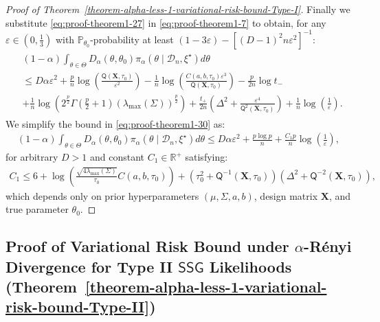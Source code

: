 \documentclass[12pt]{article}
\numberwithin{equation}{section}
\begin{document}
\begin{proof}[Proof of Theorem~\ref{theorem-alpha-less-1-variational-risk-bound-Type-I}]
Finally we substitute \eqref{eq:proof-theorem1-27} in \eqref{eq:proof-theorem1-7} to obtain, for any $\varepsilon\in \left(0, \frac{1}{3}\right)$ with $\mathbb{P}_{\theta_0}$-probability at least $(1-3\varepsilon) - [(D-1)^2n\varepsilon^2]^{-1}$:
%
\begin{align}\label{eq:proof-theorem1-30}
    \begin{split}
        &(1-\alpha)\int_{\theta\in \Theta}D_{\alpha}(\theta, \theta_0)\pi_{\alpha}(\theta\mid \mathcal{D}_n, \xi^{\star})d\theta\\
        &\leq D\alpha \varepsilon^2 + \frac{p}{n}\log\left(\frac{\mathsf{Q}(\mathbf{X}, \tau_0)}{\varepsilon^2}\right) - \frac{1}{n}\log\left(
        \frac{C(a, b, \tau_0)\varepsilon^3}{\mathsf{Q}(\mathbf{X}, \tau_0)}\right) - \frac{p}{2n}\log t_{-}\\
        &+ \frac{1}{n}\log\left(2^{\frac{p}{2}}\Gamma\left(\frac{p}{2}+1\right)\left(\lambda_{\mathrm{max}}(\Sigma)\right)^{\frac{p}{2}}\right) + \frac{t_{+}}{2n}\left(\Delta^2 + \frac{\varepsilon^4}{\mathsf{Q}^{2}(\mathbf{X}, \tau_0)}\right) + \frac{1}{n}\log\left(\frac{1}{\varepsilon}\right).
    \end{split}
\end{align}
%
We simplify the bound in \eqref{eq:proof-theorem1-30} as:
\begin{align}\label{eq:proof-theorem1-final-TypeI-bound}
%
\boxed{(1-\alpha)\int_{\theta\in \Theta}D_{\alpha}(\theta, \theta_0)\pi_{\alpha}(\theta\mid \mathcal{D}_n, \xi^{\star})d\theta
\leq D\alpha \varepsilon^2 + \frac{p\log p}{n} + \frac{C_1 p}{n}\log\left(\frac{1}{\varepsilon}\right)},
\end{align}
%
for arbitrary $D>1$ and constant $C_1 \in \mathbb{R}^{+}$ satisfying:
%
\begin{align}\label{eq:proof-theorem1-bound-constants-type-I}
C_1 \leq 6 + \log \left(\frac{\sqrt{4\lambda_{\max}(\Sigma)}}{\tau_0}C(a,b,\tau_0)\right) + \left(\tau_0^2 + \mathsf{Q}^{-1}(\mathbf{X}, \tau_0)\right)\left(\Delta^2 + \mathsf{Q}^{-2}(\mathbf{X}, \tau_0)\right),
\end{align}
%
which depends only on prior hyperparameters $(\mu, \Sigma, a, b)$, design matrix $\mathbf{X}$, and true parameter $\theta_0$. 
\end{proof}

\subsection{Proof of Variational Risk Bound under \texorpdfstring{$\alpha$-R\'{e}nyi}{alpha-Renyi} Divergence for Type II \texorpdfstring{$\mathsf{SSG}$}{SSG} Likelihoods (\texorpdfstring{Theorem~\ref{theorem-alpha-less-1-variational-risk-bound-Type-II}}{Theorem 4})}\label{app:proof-theorem-vb-alpha-less-1-type-2}
\end{document}
